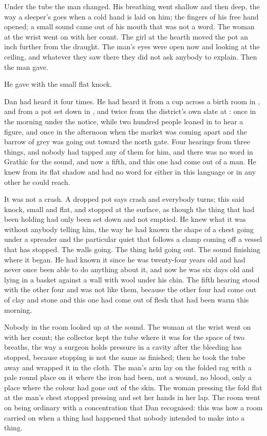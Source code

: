 Under the tube the man changed. His breathing went shallow and then deep, the way a sleeper's goes when a cold hand is laid on him; the fingers of his free hand opened; a small sound came out of his mouth that was not a word. The woman at the wrist went on with her count. The girl at the hearth moved the pot an inch further from the draught. The man's eyes were open now and looking at the ceiling, and whatever they saw there they did not ask anybody to explain. Then the man gave.

He gave with the small flat knock.

Dan had heard it four times. He had heard it from a cup across a birth room in , and from a pot set down in , and twice from the district's own slate at : once in the morning under the notice, while two hundred people leaned in to hear a figure, and once in the afternoon when the market was coming apart and the barrow of grey was going out toward the north gate. Four hearings from three things, and nobody had tapped any of them for him, and there was no word in Grathic for the sound, and now a fifth, and this one had come out of a man. He knew  from its flat shadow and had no word for either in this language or in any other he could reach.

It was not a crash. A dropped pot says crash and everybody turns; this said knock, small and flat, and stopped at the surface, as though the thing that had been holding had only been set down and not emptied. He knew what it was without anybody telling him, the way he had known the shape of a chest going under a spreader and the particular quiet that follows a clamp coming off a vessel that has stopped. The walls going. The thing held going out. The sound finishing where it began. He had known it since he was twenty-four years old and had never once been able to do anything about it, and now he was six days old and lying in a basket against a wall with wool under his chin. The fifth hearing stood with the other four and was not like them, because the other four had come out of clay and stone and this one had come out of flesh that had been warm this morning.

Nobody in the room looked up at the sound. The woman at the wrist went on with her count; the collector kept the tube where it was for the space of two breaths, the way a surgeon holds pressure in a cavity after the bleeding has stopped, because stopping is not the same as finished; then he took the tube away and wrapped it in the cloth. The man's arm lay on the folded rag with a pale round place on it where the iron had been, not a wound, no blood, only a place where the colour had gone out of the skin. The woman pressing the fold flat at the man's chest stopped pressing and set her hands in her lap. The room went on being ordinary with a concentration that Dan recognised: this was how a room carried on when a thing had happened that nobody intended to make into a thing.

